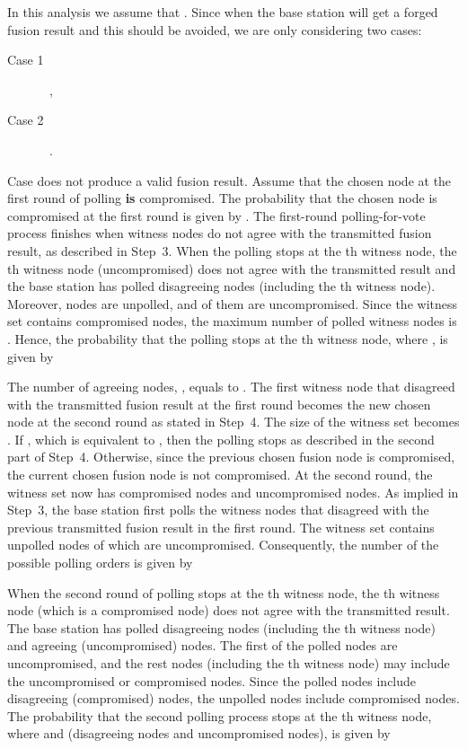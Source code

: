 \documentclass[12pt, onecolumn, draftcls]{IEEEtran}
\begin{document}
In this analysis we assume that . Since when  the
base station will get a forged fusion result and this should be
avoided, we are only considering two cases:
\begin{description}
\item[Case 1]\ ,
\item[Case 2]\ .
\end{description}
Case  does not produce a valid fusion result. Assume that the
chosen node at the first round of polling {\bf is} compromised. The
probability that the chosen node is compromised at the first round
is given by . The first-round polling-for-vote process finishes
when  witness nodes do not agree with the transmitted fusion
result, as described in Step~3. When the polling stops at the th
witness node, the th witness node (uncompromised) does not agree
with the transmitted result and the base station has polled 
disagreeing nodes (including the th witness node). Moreover,
 nodes are unpolled, and  of them are
uncompromised. Since the witness set contains  compromised
nodes, the maximum number of polled witness nodes is
. Hence, the probability that the polling stops
at the th witness node, where , is given
by

The number of agreeing nodes, , equals to . The first
witness node that disagreed with the transmitted fusion result at
the first round becomes the new chosen node at the second round as
stated in Step~4. The size of the witness set becomes . If , which is equivalent to
, then the polling stops as described in the second
part of Step~4. Otherwise, since the previous chosen fusion node is
compromised, the current chosen fusion node is not compromised. At
the second round, the witness set now has
 compromised nodes and 
uncompromised nodes. As implied in Step~3, the base station first
polls the  witness nodes that disagreed with the previous
transmitted fusion result in the first round. The witness set
contains  unpolled nodes of which  are
uncompromised. Consequently, the number of the possible polling
orders is given by

When the second round of polling stops at the th witness node,
the th witness node (which is a compromised node) does not agree
with the transmitted result. The base station has polled
 disagreeing nodes (including the th witness
node) and  agreeing
(uncompromised) nodes. The first  of the  polled nodes are
uncompromised, and the rest  nodes (including the th
witness node) may include the uncompromised or compromised nodes.
Since the  polled nodes include  disagreeing
(compromised) nodes, the  unpolled nodes include
 compromised nodes. The probability
that the second polling process stops at the th witness node,
where  and  (disagreeing nodes
and uncompromised nodes), is given by
\end{document}
